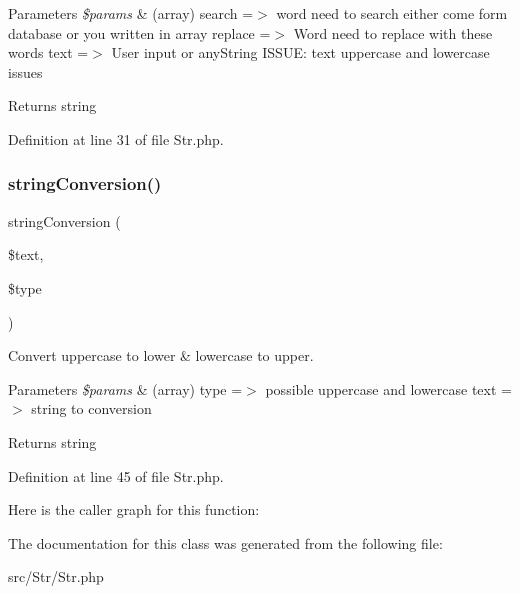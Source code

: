 \begin{DoxyParams}{Parameters}
{\em \$params} & (array) \textquotesingle{}search\textquotesingle{} =$>$ word need to search either come form database or you written in array \textquotesingle{}replace\textquotesingle{} =$>$ Word need to replace with these words \textquotesingle{}text\textquotesingle{} =$>$ User input or any\+String I\+S\+S\+UE\+: text uppercase and lowercase issues\\
\hline
\end{DoxyParams}
\begin{DoxyReturn}{Returns}
string 
\end{DoxyReturn}


Definition at line 31 of file Str.\+php.

\mbox{\label{class_zest_1_1_str_1_1_str_ada36c57d64c5bc69ccb6aa9e3ba2c4c6}} 
\subsubsection{\texorpdfstring{string\+Conversion()}{stringConversion()}}
{\footnotesize\ttfamily string\+Conversion (\begin{DoxyParamCaption}\item[{}]{\$text,  }\item[{}]{\$type }\end{DoxyParamCaption})}

Convert uppercase to lower \& lowercase to upper.


\begin{DoxyParams}{Parameters}
{\em \$params} & (array) \textquotesingle{}type\textquotesingle{} =$>$ possible uppercase and lowercase \textquotesingle{}text\textquotesingle{} =$>$ string to conversion\\
\hline
\end{DoxyParams}
\begin{DoxyReturn}{Returns}
string 
\end{DoxyReturn}


Definition at line 45 of file Str.\+php.

Here is the caller graph for this function\+:


The documentation for this class was generated from the following file\+:\begin{DoxyCompactItemize}
\item 
src/\+Str/Str.\+php\end{DoxyCompactItemize}
